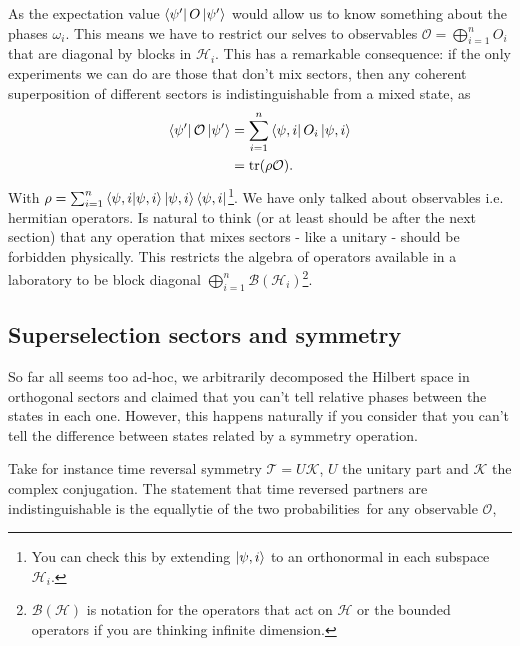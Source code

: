 As the expectation value $\bra{\psi'} O \ket{\psi'}$ would allow 
us to know something about the phases $\omega_i$. This means we have
to restrict our selves to observables $\mathcal{O}=\bigoplus_{i=1}^{n} O_i$ that are 
diagonal by blocks in $\mathcal{H}_i$. This has a remarkable consequence:
if the only experiments we can do are those that don't mix sectors,
then any coherent superposition of different sectors is indistinguishable
from a mixed state, as
\begin{align*}
\bra{\psi'}\mathcal{O}\ket{\psi'} &= \sum_{i=1}^{n}\bra{\psi,i}O_i\ket{\psi,i}\\
                                  &= \mathrm{tr}(\rho \mathcal{O}).
\end{align*}
With $\rho = \sum_{i=1}^{n}\bra{\psi,i}\ket{\psi,i}\ket{\psi,i}\bra{\psi,i}$\footnote{
    You can check this by extending $\ket{\psi,i}$ to an orthonormal
in each subspace $\mathcal{H}_i$.}.
We have only talked about observables i.e. hermitian operators. Is natural to 
think (or at least should be after the next section) that any operation that
mixes sectors - like a unitary - should be forbidden physically. This restricts
the algebra of operators available in a laboratory to be block diagonal 
$\bigoplus_{i=1}^n \mathcal{B}(\mathcal{H}_i)$\footnote{
    $\mathcal{B}(\mathcal{H})$ is notation for the operators that act on 
    $\mathcal{H}$ or the bounded operators if you are thinking 
    infinite dimension.
}. 

\subsection{Superselection sectors and symmetry}
So far all seems too ad-hoc, we arbitrarily decomposed the Hilbert space in
orthogonal sectors and claimed that you can't tell relative phases between 
the states in each one. However, this happens naturally if you consider
that you can't tell the difference between states related by a symmetry 
operation.

Take for instance time reversal symmetry $\mathcal{T}= U\mathcal{K}$,
$U$ the unitary part and $\mathcal{K}$ the complex conjugation. The statement
that time reversed partners are indistinguishable is the equallytie 
of the two probabilities\footnotemark\, for any observable $\mathcal{O}$,


